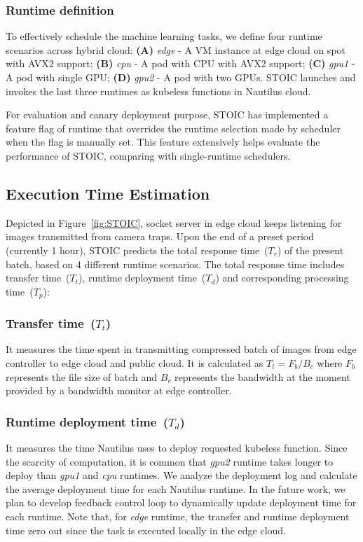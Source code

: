  \BlankLine
 \subsubsection{Runtime definition}
 To effectively schedule the machine learning tasks, we define four runtime scenarios across hybrid cloud: \textbf{(A)} \textit{edge} - A VM instance at edge cloud on spot with AVX2 support; \textbf{(B)} \textit{cpu} - A pod with CPU with AVX2 support; \textbf{(C)} \textit{gpu1} - A pod with single GPU; \textbf{(D)} \textit{gpu2} - A pod with two GPUs. STOIC launches and invokes the last three runtimes as kubeless functions in Nautilus cloud. 
 
 For evaluation and canary deployment purpose, STOIC has implemented a feature flag of runtime that overrides the runtime selection made by scheduler when the flag is manually set. This feature extensively helps evaluate the performance of STOIC, comparing with single-runtime schedulers.
 
 
 \subsection{Execution Time Estimation}
 Depicted in Figure~\ref{fig:STOIC}, socket server in edge cloud keeps listening for images transmitted from camera traps. Upon the end of a preset period (currently 1 hour), STOIC predicts the total response time~($T_r$) of the present batch, based on 4 different runtime scenarios. The total response time includes transfer time~($T_t$), runtime deployment time~($T_d$) and corresponding processing time~($T_p$): 
 
 \subsubsection{Transfer time~($T_t$)} It measures the time spent in transmitting compressed batch of images from edge controller to edge cloud and public cloud. It is calculated as ${T_t = F_b / B_c}$ where $F_b$ represents the file size of batch and $B_c$ represents the bandwidth at the moment provided by a bandwidth monitor at edge controller. 
 
 \subsubsection{Runtime deployment time~($T_d$)} It measures the time Nautilus uses to deploy requested kubeless function. Since the scarcity of computation, it is common that \textit{gpu2} runtime takes longer to deploy than \textit{gpu1} and \textit{cpu} runtimes. We analyze the deployment log and calculate the average deployment time for each Nautilus runtime. In the future work, we plan to develop feedback control loop to dynamically update deployment time for each runtime. Note that, for \textit{edge} runtime, the transfer and runtime deployment time zero out since the task is executed locally in the edge cloud.
 
